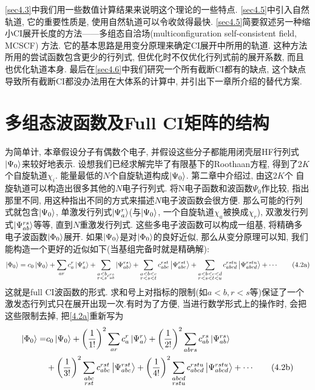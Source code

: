 \ref{sec4.3}中我们用一些数值计算结果来说明这个理论的一些特点. \ref{sec4.5}中引入自然轨道, 它的重要性质是, 使用自然轨道可以令收敛得最快. \ref{sec4.5}简要叙述另一种缩小CI展开长度的方法——多组态自洽场(multiconfiguration self-consistent field, MCSCF) 方法. 它的基本思路是用变分原理来确定CI展开中所用的轨道. 这种方法所用的尝试函数包含更少的行列式, 但优化时不仅优化行列式前的展开系数, 而且也优化轨道本身. 最后在\ref{sec4.6}中我们研究一个所有截断CI都有的缺点, 这个缺点导致所有截断CI都没办法用在大体系的计算中, 并引出下一章所介绍的替代方案.
\section{多组态波函数及Full CI矩阵的结构}
为简单计, 本章假设分子有偶数个电子, 并假设这些分子都能用闭壳层HF行列式$\Ket{\Psi_0}$来较好地表示. 设想我们已经求解完毕了有限基下的Roothaan方程, 得到了$2K$个自旋轨道${\chi_i}$. 能量最低的$N$个自旋轨道构成$\Ket{\Psi_0}$. 第二章中介绍过, 由这$2K$个 自旋轨道可以构造出很多其他的$N$电子行列式. 将N电子函数和\hft 波函数$\Psi_0$作比较, 指出那里不同, 用这种指出不同的方式来描述$N$电子波函数会很方便. 那么可能的行列式就包含$\Ket{\Psi_0}$, 单激发行列式$\Ket{\Psi_a^r}$(与$\Ket{\Psi_0}$, 一个自旋轨道$\chi_a$被换成$\chi_r$), 双激发行列式$\Ket{\Psi_{ab}^{rs}}$等等, 直到$N$重激发行列式. 这些多电子波函数可以构成一组基, 将精确多电子波函数$\Ket{\Phi_0}$展开. 如果$\Ket{\Psi_0}$是对$\Ket{\Phi_0}$的良好近似, 那么从变分原理可以知, 我们能构造一个更好的近似如下(当基组完备时就是精确解):
\begin{align}
\Ket{\Phi_0} = c_0\Ket{\Psi_0}+\sum_{ar}c_a^r\Ket{\Psi_{a}^r} + \sum_{\substack{a<b\\r<s}c_{ab}^{rs}}\Ket{\Psi_{ab}^{rs}} + \sum_{\substack{a<b<c\\r<s<t}}c_{abc}^{rst}\Ket{\Psi_{abc}^{rst}}+ \sum_{\substack{a<b<c<d\\r<s<t<u}}c_{abcd}^{rstu}\Ket{\Psi_{abcd}^{rstu}} + \cdots \tag{4.2a}
\label{4.2a}
\end{align}
这就是full CI波函数的形式. 求和号上对指标的限制(如$a<b, r<s$等)保证了一个激发态行列式只在展开出现一次.有时为了方便, 当进行数学形式上的操作时, 会把这些限制去掉, 把\eqref{4.2a}重新写为
\begin{align}
\label{4.2}
\ket{\Phi_0} =& c_0\ket{\Psi_0}+ \left( \frac{1}{1!} \right)^2\sum_{ar}c_a^r\ket{\Psi_{a}^r} + \left( \frac{1}{2!} \right)^2\sum_{\substack{abrs}}c_{ab}^{rs}\ket{\Psi_{ab}^{rs}}\notag \\
&+\left( \frac{1}{3!} \right)^2 \sum_{\substack{abc\\rst}}c_{abc}^{rst}\ket{\Psi_{abc}^{rst}}+\left( \frac{1}{4!} \right)^2 \sum_{\substack{abcd\\rstu}}c_{abcd}^{rstu}\ket{\Psi_{abcd}^{rstu}} + \cdots \tag{4.2b}
\addtocounter{equation}{1}\end{align}
